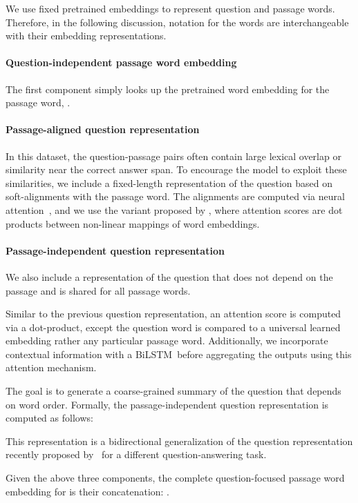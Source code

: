 \documentclass{article} \usepackage{iclr2017_conference,times}
\newcommand{\bilstm}{BiLSTM}
\begin{document}
We use fixed pretrained embeddings to represent question and passage words. Therefore, in the following discussion, notation for the words are interchangeable with their embedding representations.

\paragraph{Question-independent passage word embedding} The first component simply looks up the pretrained word embedding for the passage word, .

\paragraph{Passage-aligned question representation} In this dataset, the question-passage pairs often contain large lexical overlap or similarity near the correct answer span.
To encourage the model to exploit these similarities, we include a fixed-length representation of the question based on soft-alignments with the passage word. 
The alignments are computed via neural attention~\citep{bahdanau:2014}, and we use the variant proposed by \cite{parikh:2016}, where attention scores are dot products between non-linear mappings of word embeddings.


\paragraph{Passage-independent question representation} We also include a representation of the question that does not depend on the passage and is shared for all passage words.

Similar to the previous question representation, an attention score is computed via a dot-product, except the question word is compared to a universal learned embedding rather any particular passage word.
Additionally, we incorporate contextual information with a \bilstm~before aggregating the outputs using this attention mechanism.

The goal is to generate a coarse-grained summary of the question that depends on word order.
Formally, the passage-independent question representation  is computed as follows:

This representation is a bidirectional generalization of the question representation recently proposed by~\cite{li2016dataset} for a different question-answering task.

Given the above three components, the complete question-focused passage word embedding for  is their concatenation: .
\end{document}
